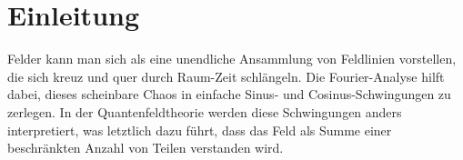 %
%
%
%

\section{Einleitung\label{fourier:section:einleitung}}


Felder kann man sich als eine unendliche Ansammlung von Feldlinien vorstellen, die sich kreuz und quer durch Raum-Zeit schlängeln. Die Fourier-Analyse hilft dabei, dieses scheinbare Chaos in einfache Sinus- und Cosinus-Schwingungen zu zerlegen. 
In der Quantenfeldtheorie werden diese Schwingungen anders interpretiert, was letztlich dazu führt, dass das Feld als Summe einer beschränkten Anzahl von Teilen verstanden wird.









